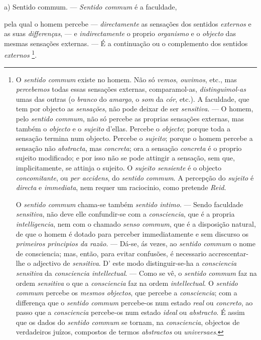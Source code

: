 a) Sentido commum. --- \emph{Sentido commum} é a faculdade,

pela qual o homem percebe --- \emph{directamente} as sensações dos sentidos \emph{externos} e as suas \emph{differenças}, --- e \emph{indirectamente} o proprio \emph{organismo} e o \emph{objecto} das mesmas sensações externas. --- É a continuação ou o complemento dos sentidos \emph{externos} \footnote{O \emph{sentido commum} existe no homem. Não só \emph{vemos}, \emph{ouvimos}, etc., mas \emph{percebemos} todas essas sensações externas, comparamol-as, \emph{distinguimol-as} umas das outras (o \emph{branco} do \emph{amargo}, o \emph{som} da \emph{cór}, etc.). A faculdade, que tem por objecto as \emph{sensações}, não pode deixar de ser \emph{sensitiva}. --- O homem, pelo \emph{sentido commum}, não só percebe as proprias sensações externas, mas também o \emph{objecto} e o \emph{sujeito} d'ellas. Percebe o \emph{objecto}; porque toda a sensação termina num objecto. Percebe o \emph{sujeito}; porque o homem percebe a sensação não \emph{abstracta}, mas \emph{concreta}; ora a sensação \emph{concreta} é o proprio sujeito modificado; e por isso não se pode attingir a sensação, sem que, implicitamente, se attinja o sujeito. O \emph{sujeito sensiente} é o objecto \emph{concomitante}, ou \emph{per accidens}, do \emph{sentido commum}. A percepção do \emph{sujeito} é \emph{directa} e \emph{immediata}, nem requer um raciocinio, como pretende \emph{Reid}.\par O \emph{sentido commum} chama-se também \emph{sentido intimo}. --- Sendo faculdade \emph{sensitiva}, não deve elle confundir-se com a \emph{consciencia}, que é a propria \emph{intelligencia}, nem com o chamado \emph{senso commum}, que é a disposição natural, de que o homem é dotado para perceber immediatamente e sem discurso os \emph{primeiros principios da razão}. --- Dá-se, ás vezes, ao \emph{sentido commum} o nome de consciencia; mas, então, para evitar confusões, é necessario accrescentar-lhe o adjectivo de \emph{sensitiva}. D' este modo distinguir-se-ha a \emph{consciencia sensitiva} da \emph{consciencia intellectual}. --- Como se vê, o \emph{sentido commum} faz na ordem \emph{sensitiva} o que a \emph{consciencia} faz na ordem \emph{intellectual}. O \emph{sentido commum} percebe os \emph{mesmos objectos}, que percebe a \emph{consciencia}; com a differença que o \emph{sentido commum} percebe-os num estado \emph{real} ou \emph{concreto}, ao passo que a \emph{consciencia} percebe-os num estado \emph{ideal} ou \emph{abstracto}. É assim que os dados do \emph{sentido commum} se tornam, na \emph{consciencia}, objectos de verdadeiros juízos, compostos de termos \emph{abstractos} ou \emph{universaes}.}.

